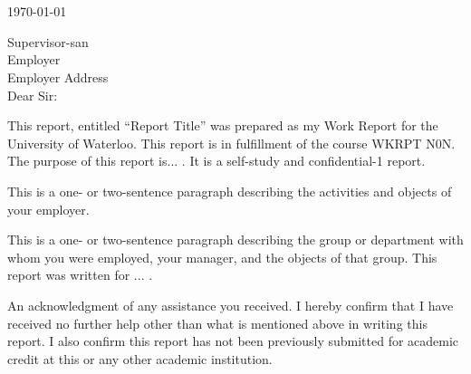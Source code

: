 \documentclass{wkrpt}
\begin{document}

\maketitle



\printauthorstreetaddress\\
\printauthorlocation\\
\printauthorpostalcode

\today

Supervisor-san\\
Employer\\
Employer Address\\

Dear Sir:

This report, entitled ``Report Title'' was prepared as my \printterm Work Report for the University of Waterloo. This report is in fulfillment of the course WKRPT N0N. The purpose of this report is... .  It is a self-study and confidential-1 report.

This is a one- or two-sentence paragraph describing the activities and objects of your employer.

This is a one- or two-sentence paragraph describing the group or department with whom you were employed, your manager, and the objects of that group.  This report was written for ... .

An acknowledgment of any assistance you received.  I hereby confirm that I have received no further help other than what is mentioned above in writing this report. I also confirm this report has not been previously submitted for academic credit at this or any other academic institution.
\end{document}
